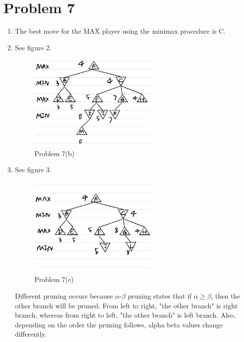 \documentclass{article}
\begin{document}
\section*{Problem 7}
\begin{enumerate}[label=(\alph*)]
\item The best move for the MAX player using the minimax procedure is C.
\item See figure 2.
\begin{figure}
        \centering
        \includegraphics[width=0.6\textwidth]{7b.jpg}
        \caption{Problem 7(b)}
\end{figure}
\item See figure 3. 
\begin{figure}
        \centering
        \includegraphics[width=0.6\textwidth]{7c.jpg}
        \caption{Problem 7(c)}
\end{figure}
Different pruning occurs because $\alpha$-$\beta$ pruning states that if $\alpha \geq \beta$, then the other branch will be pruned. From left to right, "the other branch" is right branch, whereas from right to left, "the other branch" is left branch. Also, depending on the order the pruning follows, alpha beta values change differently.
\end{enumerate}
\end{document}
